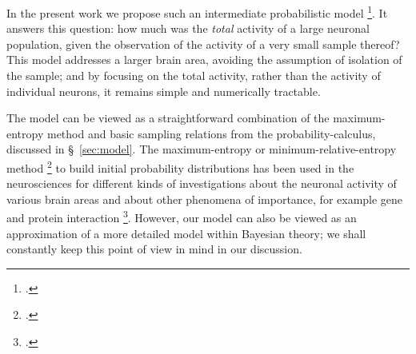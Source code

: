 \documentclass[\ifafour a4paper,12pt,\else a5paper,10pt,\fi%
onecolumn,oneside,article,%
british%
]{memoir}
\theoremstyle{remark}
\theoremstyle{innote}
\newcommand*{\citep}{\footcites}
\renewcommand*{\|}{\nonscript\,\vert\nonscript\;\mathopen{}}
\newcommand*{\sect}{\S}%
\newcommand*{\chap}{ch.}%
\newcommand*{\cf}{{cf.}}
\newcommand*{\puzzle}{{\fontencoding{U}\fontfamily{fontawesometwo}\selectfont\symbol{225}}}
\newcommand{\mynote}[1]{ {\color{notecolour}\puzzle\ #1}}
\begin{document}
In the present work we propose such an intermediate probabilistic model
\citep[\cf][]{portamanaetal2015}. It answers this question: how much was
the \emph{total} activity of a large neuronal population, given the
observation of the activity of a very small sample thereof? This model
addresses a larger brain area, avoiding the assumption of isolation of the
sample; and by focusing on the total activity, rather than the activity of
individual neurons, it remains simple and numerically tractable.


The model can be viewed as a straightforward combination of the
maximum-entropy method and basic sampling relations from the
probability-calculus, discussed in \sect~\ref{sec:model}. The
maximum-entropy or minimum-relative-entropy method
\citep{jaynes1957}[\chap~11]{jaynes1994_r2003}[for the minimum-relative
entropy method see:][\sect~4.b]{jaynes1963}[for a more rigorous
derivation]{hobsonetal1973}[for applications]{sivia1996_r2006}
to build initial probability distributions has been used in the
neurosciences for different kinds of investigations about the neuronal
activity of various brain areas and about other phenomena of importance,
for example gene and protein interaction
\citep[]{martignonetal1995,bohteetal2000,shlensetal2006,schneidmanetal2006,tkaciketal2006,roudietal2009c,barreiroetal2010,shimazakietal2015,moraetal2015,lezonetal2006,weigtetal2009}[for
further references see][]{lathametal2013}. However, our model can also be
viewed as an approximation of a more detailed model within Bayesian theory;
we shall constantly keep this point of view in mind in our discussion.
\end{document}
